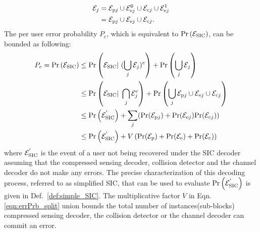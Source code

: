 \begin{align*}
\mathcal{E}_j&=\mathcal{E}_{\mathrm{p}j}\cup\mathcal{E}^0_{\mathrm{e}j}\cup \mathcal{E}_{\mathrm{c}j} \cup \mathcal{E}^1_{\mathrm{e}j}\\
&=\mathcal{E}_{\mathrm{p}j}\cup\mathcal{E}_{\mathrm{e}j}\cup \mathcal{E}_{\mathrm{c}j}.
\end{align*}
The per user error probability $P_e$, which is equivalent to $\mathrm{Pr}\left(\mathcal{E}_{\text{SIC}}\right)$, can be bounded as following:
\begin{align}
P_e=\mathrm{Pr}\left(\mathcal{E}_{\text{SIC}}\right) &\leq \mathrm{Pr}\left(\mathcal{E}_{\text{SIC}}| ~(\bigcup_{j}\mathcal{E}_j)^c\right)+ \mathrm{Pr}\left(\bigcup_{j}\mathcal{E}_j\right)\notag\\
&\leq \mathrm{Pr}\left(\mathcal{E}_{\text{SIC}}|~\bigcap_{j}\mathcal{E}_j^c\right)+ \mathrm{Pr}\left(\bigcup_{j}\mathcal{E}_{\mathrm{p}j}\cup \mathcal{E}_{\mathrm{e}j}\cup \mathcal{E}_{\mathrm{c}j}\right)\notag\\
&\leq\mathrm{Pr}\left(\mathcal{E}^{'}_{\text{SIC}}\right)+\sum_{j} (\mathrm{Pr} (\mathcal{E}_{\mathrm{p}j})+\mathrm{Pr} (\mathcal{E}_{\mathrm{e}j}) \mathrm{Pr} (\mathcal{E}_{\mathrm{c}j}))\notag\\
&\leq\mathrm{Pr}\left(\mathcal{E}^{'}_{\text{SIC}}\right)+V\left(\mathrm{Pr}(\mathcal{E}_{\mathrm{p}})+\mathrm{Pr} (\mathcal{E}_{\mathrm{e}})+\mathrm{Pr}(\mathcal{E}_{\mathrm{c}}) \right) \label{eqn:errPrb_split}
\end{align}
where $\mathcal{E}^{'}_{\text{SIC}}$ is the event of a user not being recovered under the SIC decoder assuming that the compressed sensing decoder, collision detector and the channel decoder do not make any errors. The precise characterization of this decoding process, referred to as simplified SIC, that can be used to evaluate $\mathrm{Pr}\left(\mathcal{E}^{'}_{\text{SIC}}\right)$ is given in Def.~\ref{def:simple_SIC}. The multiplicative factor $V$ in Eqn. \eqref{eqn:errPrb_split} union bounds the total number of instances(sub-blocks) compressed sensing decoder, the collision detector or the channel decoder can commit an error.

